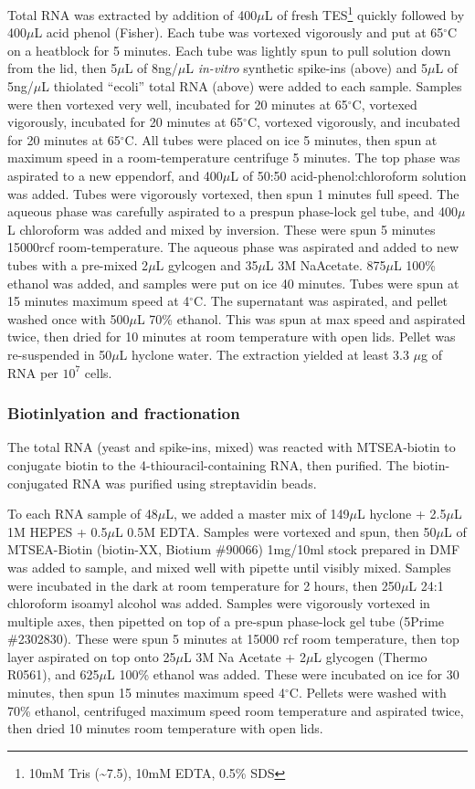 Total RNA was extracted by addition of 400\(\mu\)L of fresh
TES\footnote{10mM Tris (\textasciitilde{}7.5), 10mM EDTA, 0.5\% SDS}
quickly followed by 400\(\mu\)L acid phenol (Fisher). Each tube was
vortexed vigorously and put at 65\(^{\circ}\)C on a heatblock for 5
minutes. Each tube was lightly spun to pull solution down from the lid,
then 5\(\mu\)L of 8ng/\(\mu\)L \emph{in-vitro} synthetic spike-ins
(above) and 5\(\mu\)L of 5ng/\(\mu\)L thiolated ``ecoli'' total RNA
(above) were added to each sample. Samples were then vortexed very well,
incubated for 20 minutes at 65\(^{\circ}\)C, vortexed vigorously,
incubated for 20 minutes at 65\(^{\circ}\)C, vortexed vigorously, and
incubated for 20 minutes at 65\(^{\circ}\)C. All tubes were placed on
ice 5 minutes, then spun at maximum speed in a room-temperature
centrifuge 5 minutes. The top phase was aspirated to a new eppendorf,
and 400\(\mu\)L of 50:50 acid-phenol:chloroform solution was added.
Tubes were vigorously vortexed, then spun 1 minutes full speed. The
aqueous phase was carefully aspirated to a prespun phase-lock gel tube,
and 400\(\mu\)L chloroform was added and mixed by inversion. These were
spun 5 minutes 15000rcf room-temperature. The aqueous phase was
aspirated and added to new tubes with a pre-mixed 2\(\mu\)L gylcogen and
35\(\mu\)L 3M NaAcetate. 875\(\mu\)L 100\% ethanol was added, and
samples were put on ice 40 minutes. Tubes were spun at 15 minutes
maximum speed at 4\(^{\circ}\)C. The supernatant was aspirated, and
pellet washed once with 500\(\mu\)L 70\% ethanol. This was spun at max
speed and aspirated twice, then dried for 10 minutes at room temperature
with open lids. Pellet was re-suspended in 50\(\mu\)L hyclone water. The
extraction yielded at least 3.3 \(\mu\)g of RNA per \(10^7\) cells.

\subsubsection{Biotinlyation and fractionation}

The total RNA (yeast and spike-ins, mixed) was reacted with MTSEA-biotin
to conjugate biotin to the 4-thiouracil-containing RNA, then purified.
The biotin-conjugated RNA was purified using streptavidin beads.

To each RNA sample of 48\(\mu\)L, we added a master mix of 149\(\mu\)L
hyclone + 2.5\(\mu\)L 1M HEPES + 0.5\(\mu\)L 0.5M EDTA. Samples were
vortexed and spun, then 50\(\mu\)L of MTSEA-Biotin (biotin-XX, Biotium
\#90066) 1mg/10ml stock prepared in DMF was added to sample, and mixed
well with pipette until visibly mixed. Samples were incubated in the
dark at room temperature for 2 hours, then 250\(\mu\)L 24:1 chloroform
isoamyl alcohol was added. Samples were vigorously vortexed in multiple
axes, then pipetted on top of a pre-spun phase-lock gel tube (5Prime
\#2302830). These were spun 5 minutes at 15000 rcf room temperature,
then top layer aspirated on top onto 25\(\mu\)L 3M Na Acetate +
2\(\mu\)L glycogen (Thermo R0561), and 625\(\mu\)L 100\% ethanol was
added. These were incubated on ice for 30 minutes, then spun 15 minutes
maximum speed 4\(^{\circ}\)C. Pellets were washed with 70\% ethanol,
centrifuged maximum speed room temperature and aspirated twice, then
dried 10 minutes room temperature with open lids.

